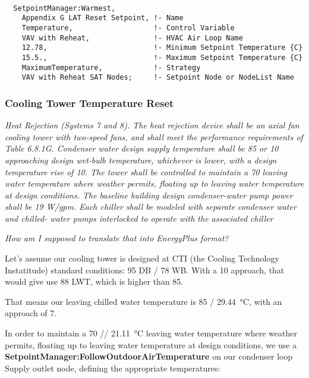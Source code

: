 \begin{lstlisting}

  SetpointManager:Warmest,
    Appendix G LAT Reset Setpoint, !- Name
    Temperature,                   !- Control Variable
    VAV with Reheat,               !- HVAC Air Loop Name
    12.78,                         !- Minimum Setpoint Temperature {C}
    15.5.,                         !- Maximum Setpoint Temperature {C}
    MaximumTemperature,            !- Strategy
    VAV with Reheat SAT Nodes;     !- Setpoint Node or NodeList Name

\end{lstlisting}


\subsubsection{Cooling Tower Temperature Reset}%
\label{ssub:cooling_tower_temperature_reset}

\emph{Heat Rejection (Systems 7 and 8). The heat
rejection device shall be an axial fan cooling tower with two-speed fans, and shall meet the performance requirements of
Table 6.8.1G. Condenser water design supply temperature shall
be \SI{85}{\farenheit} or \SI{10}{\farenheit} approaching design wet-bulb temperature,
whichever is lower, with a design temperature rise of \SI{10}{\farenheit}. The
tower shall be controlled to maintain a \SI{70}{\farenheit} leaving water
temperature where weather permits, floating up to leaving water
temperature at design conditions. The baseline building design
condenser-water pump power shall be 19 W/gpm. Each chiller
shall be modeled with separate condenser water and chilled-
water pumps interlocked to operate with the associated chiller}

\emph{How am I supposed to translate that into EnergyPlus format?}

Let's assume our cooling tower is designed at CTI (the Cooling Technology Instatitude) standard conditions: \SI{95}{\farenheit} DB / \SI{78}{\farenheit} WB.
With a \SI{10}{\farenheit} approach, that would give use \SI{88}{\farenheit} LWT, which is higher than \SI{85}{\farenheit}.

That means our leaving chilled water temperature is \SI{85}{\farenheit} / \SI{29.44}{\celsius}, with an approach of \SI{7}{\farenheit}.

In order to   maintain a \SI{70}{\farenheit} // \SI{21.11}{\celsius} leaving water temperature where weather permits, floating up to leaving water
temperature at design conditions, we use a \textbf{SetpointManager:FollowOutdoorAirTemperature} on our condenser loop Supply outlet node, defining the appropriate temperatures:

